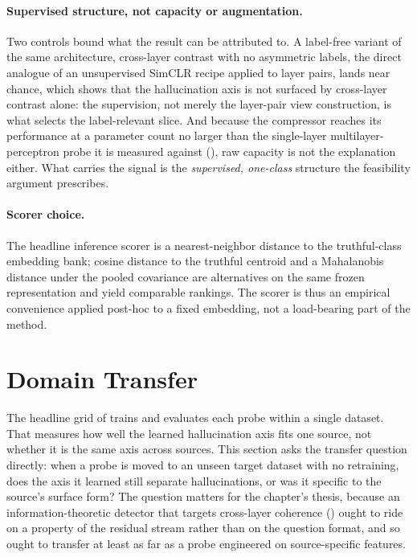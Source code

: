 \paragraph{Supervised structure, not capacity or augmentation.}
Two controls bound what the result can be attributed to. A label-free variant of
the same architecture, cross-layer contrast with no asymmetric labels, the
direct analogue of an unsupervised SimCLR recipe applied to layer pairs, lands
near chance, which shows that the hallucination axis is not surfaced by
cross-layer contrast alone: the supervision, not merely the layer-pair view
construction, is what selects the label-relevant slice. And because the compressor
reaches its performance at a parameter count no larger than the single-layer
multilayer-perceptron probe it is measured against (),
raw capacity is not the explanation either. What carries the signal is the
\emph{supervised, one-class} structure the feasibility argument prescribes.

\paragraph{Scorer choice.}
The headline inference scorer is a nearest-neighbor distance to the truthful-class
embedding bank; cosine distance to the truthful centroid and a Mahalanobis
distance under the pooled covariance are alternatives on the same frozen
representation and yield comparable rankings. The scorer is thus an empirical
convenience applied post-hoc to a fixed embedding, not a load-bearing part of the
method.

\section{Domain Transfer}
\label{sec:hd:transfer}

The headline grid of  trains and evaluates each probe within a single dataset. That measures how well the learned hallucination axis fits one source, not whether it is the same axis across sources. This section asks the transfer question directly: when a probe is moved to an unseen target dataset with no retraining, does the axis it learned still separate hallucinations, or was it specific to the source's surface form? The question matters for the chapter's thesis, because an information-theoretic detector that targets cross-layer coherence () ought to ride on a property of the residual stream rather than on the question format, and so ought to transfer at least as far as a probe engineered on source-specific features.

